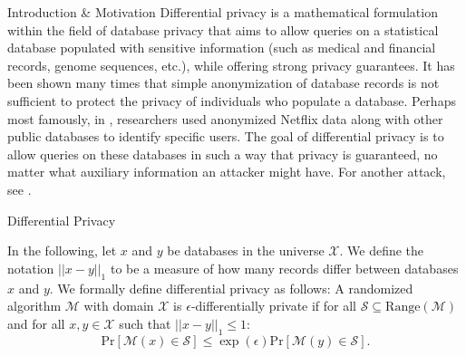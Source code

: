\documentclass[final]{beamer}
\newlength{\onecolwid}
\begin{document}
\begin{frame}[t]
\begin{columns}[t]
\begin{column}{\onecolwid}
\begin{block}{Introduction \& Motivation}
Differential privacy is a mathematical formulation within the field of database privacy that aims to allow queries on a statistical database populated with sensitive information (such as medical and financial records, genome sequences, etc.), while offering strong privacy guarantees.
It has been shown many times that simple anonymization of database records is not sufficient to protect the privacy of individuals who populate a database. Perhaps most famously, in \cite{narayanan2008robust}, researchers used anonymized Netflix data along with other public databases %
to identify specific users. %
 The goal of differential privacy is to allow queries on these databases in such a way that privacy is guaranteed, no matter what auxiliary information an attacker might have. For another attack, see \cite{homer2008resolving}.

\end{block}


\begin{block}{Differential Privacy}

In the following, let $x$ and $y$ be databases in the universe $\mathcal{X}$. We define the notation $||x-y||_1$ to be a measure of how many records differ between databases $x$ and $y$. We formally define differential privacy as follows:
A randomized algorithm $\mathcal{M}$ with domain $\mathcal{X}$ is $\epsilon$-differentially private if for all $\mathcal{S}\subseteq \text{Range}(\mathcal{M})$ and for all $x,y \in\mathcal{X}$ such that $||x - y||_1 \leq 1$:
\[
\text{Pr}[\mathcal{M}(x) \in \mathcal{S}] \leq \exp(\epsilon) \text{Pr}[\mathcal{M}(y) \in \mathcal{S}].
\]


\end{block}
\end{column}
\end{columns}
\end{frame}
\end{document}
